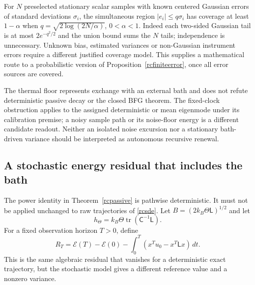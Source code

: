 \documentclass[11pt,letterpaper]{article}
\newcommand{\tr}{\operatorname{tr}}
\theoremstyle{definition}
\numberwithin{equation}{section}
\begin{document}
For $N$ preselected stationary scalar samples with known centered Gaussian errors of standard deviations $\sigma_i$, the simultaneous region $|e_i|\leq q\sigma_i$ has coverage at least $1-\alpha$ when $q=\sqrt{2\log(2N/\alpha)}$, $0<\alpha<1$. Indeed each two-sided Gaussian tail is at most $2e^{-q^2/2}$ and the union bound sums the $N$ tails; independence is unnecessary. Unknown bias, estimated variances or non-Gaussian instrument errors require a different justified coverage model. This supplies a mathematical route to a probabilistic version of Proposition~\ref{rcfiniteerror}, once all error sources are covered.

The thermal floor represents exchange with an external bath and does not refute deterministic passive decay or the closed BFG theorem. The fixed-clock obstruction applies to the assigned deterministic or mean eigenmode under its calibration premise; a noisy sample path or its noise-floor energy is a different candidate readout. Neither an isolated noise excursion nor a stationary bath-driven variance should be interpreted as autonomous recursive renewal.

\subsection{A stochastic energy residual that includes the bath}
The power identity in Theorem~\ref{rcpassive} is pathwise deterministic. It must not be applied unchanged to raw trajectories of \eqref{rcsde}. Let $B=(2k_B\Theta\mathsf L)^{1/2}$ and let
\begin{equation}\label{thermaldrift}
h_\Theta=k_B\Theta\tr(\mathsf C^{-1}\mathsf L).
\end{equation}
For a fixed observation horizon $T>0$, define
\begin{equation}\label{thermalresidual}
R_T=\mathcal E(T)-\mathcal E(0)-\int_0^T(x^Tu_0-x^T\mathsf Lx)\,dt.
\end{equation}
This is the same algebraic residual that vanishes for a deterministic exact trajectory, but the stochastic model gives a different reference value and a nonzero variance.
\end{document}
